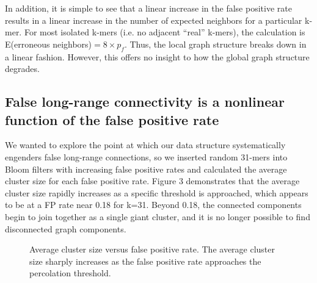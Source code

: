 \documentclass[12pt]{article} \usepackage{simplemargins}
\begin{document}
In addition, it is simple to see that a linear increase in the false 
positive rate results in a linear increase in the number of expected 
neighbors for a particular k-mer. For most isolated k-mers (i.e. no adjacent 
``real'' k-mers), the calculation is 
E(erroneous neighbors)$ = 8 \times p_f$. Thus, the local graph 
structure breaks down in a linear fashion. However, this offers no insight 
to how the global graph structure degrades.

\subsection{False long-range connectivity is a nonlinear function of the false positive rate}

We wanted to explore the point at which our data structure systematically 
engenders false long-range connections, 
so we inserted random 31-mers into Bloom
filters with increasing false positive rates and calculated the average
cluster size for each false positive rate. Figure 3 demonstrates that 
the average cluster
size rapidly increases as a specific threshold is approached,
which appears to be at a FP rate near 0.18 for k=31. Beyond 0.18, 
the connected components begin to join together as a single giant 
cluster, and it is no longer possible to find disconnected graph components.

\begin{figure}
\caption{Average cluster size versus false positive rate. The average 
cluster size sharply increases as the false positive 
rate approaches the percolation threshold.
}
\end{figure}
\end{document}
